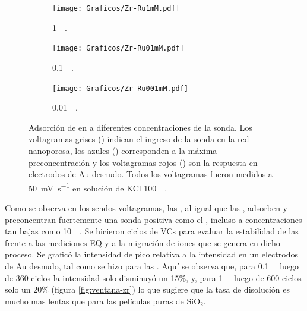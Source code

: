 	 			\begin{figure}[th]
			   	    \begin{subfigure}[t]{0.325\textwidth}
			        	\texttt{[image: Graficos/Zr-Ru1mM.pdf]}
			        	\vspace*{-0.40cm}\caption{\aminorutenio\space \SI{1}{\milli\Molar}.}
			         	\label{fig:Zr-Ru1mM}
			     		\end{subfigure}
			   	    \begin{subfigure}[t]{0.325\textwidth}
			        	\texttt{[image: Graficos/Zr-Ru01mM.pdf]}
			       		\vspace*{-0.40cm}\caption{\aminorutenio\space \SI{0.1}{\milli\Molar}.}
			         	\label{fig:Zr-Ru0.1mM}
			     		\end{subfigure}
		     		\begin{subfigure}[t]{0.325\textwidth}
			        	\texttt{[image: Graficos/Zr-Ru001mM.pdf]}
			       		\vspace*{-0.40cm}\caption{\aminorutenio\space \SI{0.01}{\milli\Molar}.}
			         	\label{fig:Zr-Ru0.01mM}
			     		\end{subfigure}
			     		\caption[Preconcentración de \aminorutenio\space en \pdmZ]{Adsorción de \ru\space en \pdmZ\space a diferentes concentraciones de la sonda. Los voltagramas grises (\usebox{\gris}) indican el ingreso de la sonda en la red nanoporosa, los azules (\usebox{\azul}) corresponden a la máxima preconcentración y los voltagramas rojos (\usebox{\rojo}) son la respuesta en electrodos de Au desnudo. Todos los voltagramas fueron medidos a \SI{50}{\milli\volt\per\second} en solución de KCl \SI{100}{\milli\Molar}.}
			     		\label{fig:precon_ZR}
		     		\end{figure}
		 \newpage

		 Como se observa en los sendos voltagramas, las \pdmZ, al igual que las \pdmF, adsorben y preconcentran fuertemente una sonda positiva como el \ru,	incluso a concentraciones tan bajas como \SI{10}{\micro\Molar}. Se hicieron ciclos de VCs para evaluar la estabilidad de las \pdmZ\space frente a las mediciones EQ y a la migración de iones que se genera en dicho proceso. Se graficó la intensidad de pico relativa a la intensidad en un electrodos de Au desnudo, tal como se hizo para las \pdmF. Aquí se observa que, para \ru\space \SI{0.1}{\milli\Molar} luego de 360 ciclos la intensidad solo disminuyó un 15\%, y, para \ru\space \SI{1}{\milli\Molar} luego de 600 ciclos solo un 20\% (figura \ref{fig:ventana-zr}) lo que sugiere que la tasa de disolución es mucho mas lentas que para las películas puras de SiO$_2$.

